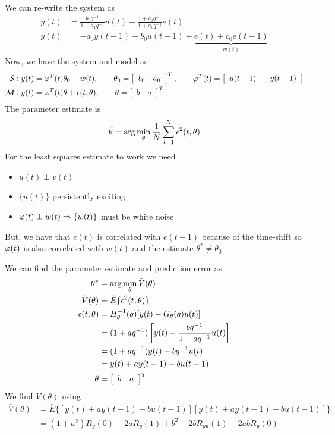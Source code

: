 \begin{example}
We can re-write the system as
\begin{align*}
y(t) &= \frac{b_0q^{-1}}{1+a_1q^{-1}}u(t) + \frac{1+c_0q^{-1}}{1+a_0q^{-1}}e(t) \\
y(t) &= -a_0y(t-1) + b_0u(t-1) + \underbrace{e(t) + c_0e(t-1)}_{w(t)}
\end{align*}
Now, we have the system and model as
\begin{align*}
\mathcal{S}: y(t) &= \varphi^T(t)\theta_0+w(t), \qquad \theta_0=\left[\begin{array}{c c} b_0 & a_0 \end{array}\right]^T, \qquad \varphi^T(t) = \left[\begin{array}{c c} u(t-1) & -y(t-1) \end{array}\right] \\
\mathcal{M}: y(t) &= \varphi^T(t)\theta+\epsilon(t,\theta), \qquad \theta=\left[\begin{array}{c c} b & a\end{array}\right]^T
\end{align*}
The parameter estimate is
$$\hat{\theta} = \arg\min_\theta\frac{1}{N}\sum_{t=1}^N\epsilon^2(t,\theta)$$
For the least squares estimate to work we need
\begin{itemize}
\item $u(t)\perp v(t)$
\item $\{u(t)\}$ persistently exciting
\item $\varphi(t)\perp w(t) \Rightarrow \{w(t)\}$ must be white noise
\end{itemize}
But, we have that $e(t)$ is correlated with $e(t-1)$ because of the time-shift so $\varphi(t)$ is also correlated with $w(t)$ and the estimate $\theta^\ast\neq\theta_0$.

We can find the parameter estimate and prediction error as
\begin{align*}
\theta^\ast &= \arg\min_\theta\bar{V}(\theta) \\
\bar{V}(\theta) &= \bar{E}\{\epsilon^2(t,\theta)\} \\
\epsilon(t,\theta) &= H_\theta^{-1}(q)[y(t)-G_\theta(q)u(t)] \\
&= (1+aq^{-1})\left[y(t) - \frac{bq^{-1}}{1+aq^{-1}}u(t)\right] \\
&= (1+aq^{-1})y(t) - bq^{-1}u(t) \\
&= y(t)+ay(t-1)-bu(t-1) \\
\theta &= \left[\begin{array}{c c} b & a \end{array}\right]^T
\end{align*}
We find $\bar{V}(\theta)$ using
\begin{align*}
\bar{V}(\theta) &= \bar{E}\{[y(t)+ay(t-1)-bu(t-1)][y(t)+ay(t-1)-bu(t-1)]\} \\
&= (1+a^2)R_y(0) + 2aR_y(1) + b^2 - 2bR_{yu}(1) - 2abR_y(0)
\end{align*}


\end{example}
